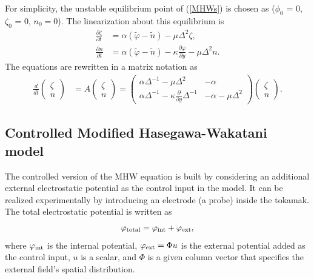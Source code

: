 \documentclass[12pt,lot, lof]{puthesis}
\begin{document}
For simplicity, the unstable equilibrium point of (\ref{MHWs}) is chosen as ($\phi_0$ = 0, $\zeta_0$ = 0, $n_0=0$).
The linearization about this equilibrium is
\begin{subequations}
\begin{align}
\frac{\partial \zeta}{\partial t}  &= \alpha (\tilde{\varphi}-\tilde{n}) - \mu \Delta^2 \zeta,\\
\frac{\partial n}{\partial t}   &= \alpha (\tilde{\varphi}- \tilde{n}) -\kappa \frac{\partial \varphi}{\partial y}- \mu \Delta^2 n.
\end{align}
\end{subequations}
The equations are rewritten in a matrix notation as
%
\begin{align}
	\frac{d}{dt} {\left( \begin{matrix} \zeta \\ n \end{matrix} \right)}
	&= A {\left( \begin{matrix} \zeta \\ n \end{matrix} \right)} 
	= {\left( \begin{matrix}
		\alpha \Delta^{-1} - \mu \Delta^2 & -\alpha \\
		\alpha \Delta^{-1} - \kappa \frac{\partial}{\partial y} \Delta^{-1} & -\alpha - \mu \Delta^2
	\end{matrix} \right)} {\left( \begin{matrix} \zeta \\ n \end{matrix} \right)} .
	\label{mat}
\end{align}

\subsection{Controlled Modified Hasegawa-Wakatani model}

The controlled version of the MHW equation is built by considering an additional external electrostatic potential as the control input in the model. It can be realized experimentally by introducing an electrode (a probe) inside the tokamak. \cite{Klinger1,Klinger2} The total electrostatic potential is written as
%
\begin{equation}
	\varphi_{\rm total} = \varphi_{\rm int} + \varphi_{\rm ext},
\end{equation}
%
where $\varphi_{\rm int}$ is the internal potential, $\varphi_{\rm ext} = \Phi u$ is the external potential added as the control input, $u$ is a scalar, and $\Phi$ is a given column vector that specifies the external field's spatial distribution.
\end{document}
